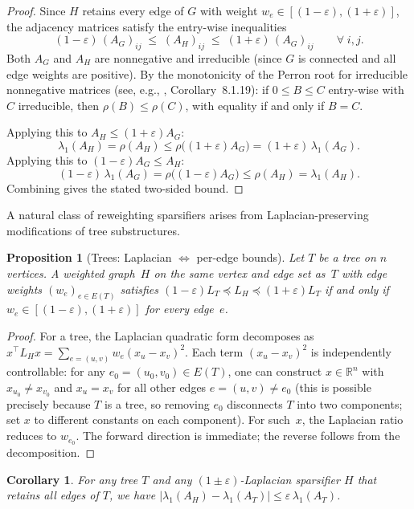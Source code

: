 \documentclass[11pt]{article}
\newtheorem{proposition}[theorem]{Proposition}
\newtheorem{corollary}[theorem]{Corollary}
\theoremstyle{definition}
\newcommand{\eps}{\varepsilon}
\newcommand{\lamH}{\lambda_1(A_H)}
\newcommand{\lamG}{\lambda_1(A_G)}
\newcommand{\AG}{A_G}
\newcommand{\AH}{A_H}
\newcommand{\R}{\mathbb{R}}
\begin{document}
\begin{proof}
Since $H$ retains every edge of $G$ with weight $w_e \in [(1-\eps),(1+\eps)]$, the
adjacency matrices satisfy the entry-wise inequalities
\[
(1-\eps)\,(\AG)_{ij} \;\leq\; (\AH)_{ij} \;\leq\; (1+\eps)\,(\AG)_{ij}
\qquad \forall\; i,j.
\]
Both $\AG$ and $\AH$ are nonneg\-ative and irreducible (since $G$ is connected and all
edge weights are positive). By the monotonicity of the Perron root for irreducible
nonneg\-ative matrices (see, e.g., \citet{horn2012matrix}, Corollary~8.1.19): if
$0 \leq B \leq C$ entry-wise with $C$ irreducible, then $\rho(B) \leq \rho(C)$, with
equality if and only if $B = C$.

Applying this to $\AH \leq (1+\eps)\AG$:
\[
\lamH = \rho(\AH) \leq \rho\!\bigl((1+\eps)\AG\bigr) = (1+\eps)\,\lamG.
\]
Applying this to $(1-\eps)\AG \leq \AH$:
\[
(1-\eps)\,\lamG = \rho\!\bigl((1-\eps)\AG\bigr) \leq \rho(\AH) = \lamH.
\]
Combining gives the stated two-sided bound.
\end{proof}

A natural class of reweighting sparsifiers arises from Laplacian-preserving
modifications of tree substructures.

\begin{proposition}[Trees: Laplacian $\Leftrightarrow$ per-edge bounds]\label{prop:tree}
Let $T$ be a tree on $n$ vertices. A weighted graph~$H$ on the same vertex and edge set
as~$T$ with edge weights $(w_e)_{e \in E(T)}$ satisfies
$(1-\eps)L_T \preceq L_H \preceq (1+\eps)L_T$ if and only if
$w_e \in [(1-\eps), (1+\eps)]$ for every edge~$e$.
\end{proposition}

\begin{proof}
For a tree, the Laplacian quadratic form decomposes as
$x^\top L_H x = \sum_{e=(u,v)} w_e (x_u - x_v)^2$.
Each term $(x_u - x_v)^2$ is independently controllable: for any
$e_0 = (u_0, v_0) \in E(T)$, one can construct $x \in \R^n$ with
$x_{u_0} \neq x_{v_0}$ and $x_u = x_v$ for all other edges $e = (u,v) \neq e_0$
(this is possible precisely because $T$ is a tree, so removing $e_0$ disconnects $T$
into two components; set $x$ to different constants on each component).
For such~$x$, the Laplacian ratio reduces to $w_{e_0}$. The forward direction is
immediate; the reverse follows from the decomposition.
\end{proof}

\begin{corollary}\label{cor:tree-sharp}
For any tree $T$ and any $(1\pm\eps)$-Laplacian sparsifier $H$ that retains all edges of
$T$, we have $|\lambda_1(A_H) - \lambda_1(A_T)| \leq \eps\,\lambda_1(A_T)$.
\end{corollary}
\end{document}
